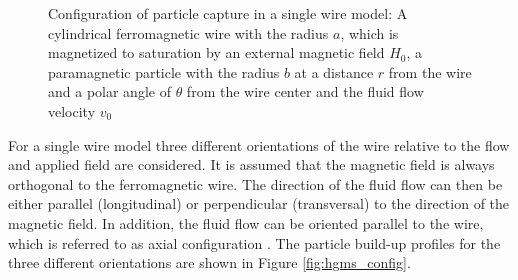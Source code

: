 \begin{figure}[h]
\centering
{}
\caption[Configuration of particle capture in a single wire model]{Configuration of particle capture in a single wire model: A cylindrical ferromagnetic wire with the radius $a$, which is magnetized to saturation by an external magnetic field $H_{0}$, a paramagnetic particle with the radius $b$ at a distance $r$ from the wire and a polar angle of $\theta$ from the wire center and the fluid flow velocity $v_{0}$ \cite{svoboda2004magnetic}
\label{fig:wire}
}
\end{figure}

For a single wire model three different orientations of the wire relative to the flow and applied field are considered. It is assumed that the magnetic field is always orthogonal to the ferromagnetic wire. The direction of the fluid flow can then be either parallel (longitudinal) or perpendicular (transversal) to the direction of the magnetic field. In addition, the fluid flow can be oriented parallel to the wire, which is referred to as axial configuration \cite{friedlaender1978particle}. The particle build-up profiles for the three different orientations are shown in Figure \ref{fig:hgms_config}.   

